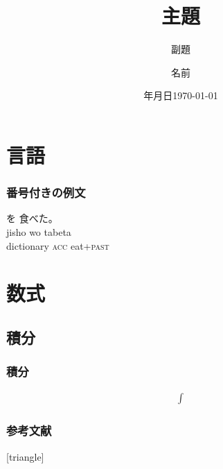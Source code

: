 \documentclass[11pt]{beamer}
\title{主題}
\subtitle{副題}
\institute{所属}
\author{名前}
\date{{\number\year}年{\number\month}月{\number\day}日}
\date{\today}
\newcommand{\maru}{。}
\begin{document}
\begin{frame}
    \nocite{demo}
    \maketitle
\end{frame}

\section{言語}
\begin{frame}
\frametitle{番号付きの例文}
    \begin{exe}
        \ex%
         {を} {食べた\maru{}} \\
              {jisho} {wo} {tabeta} \\
              {dictionary} {\textsc{acc}} {eat+\textsc{past}} \\
    \end{exe}
\end{frame}

\section{数式}
\subsection{積分}
\begin{frame}
\frametitle{積分}
\begin{align}
    \int
\end{align}
\end{frame}

\begin{frame}[allowframebreaks]
\frametitle{参考文献}
\begingroup
\scriptsize
    [triangle]
    
    
\endgroup
\end{frame}
\end{document}
